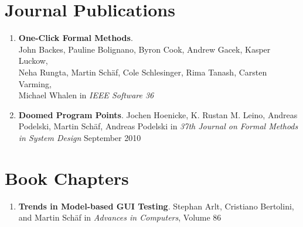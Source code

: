 \section{\sc Journal Publications}

\begin{enumerate} \setcounter{enumi}{\value{saveenum}}

\item \textbf{One-Click Formal Methods}.
\\ John Backes, Pauline Bolignano, Byron Cook, Andrew Gacek, Kasper Luckow, \\
Neha Rungta, Martin Sch\"af, Cole Schlesinger, Rima Tanash, Carsten Varming, \\
Michael Whalen in 
\emph{IEEE Software 36}

\item  \textbf{Doomed Program Points}. Jochen Hoenicke, K. Rustan M. Leino,
Andreas Podelski, Martin Sch\"af, Andreas Podelski in
\emph{37th Journal on Formal Methods in System Design}
September 2010

\setcounter{saveenum}{\value{enumi}}
\end{enumerate}


\section{\sc Book Chapters}

\begin{enumerate} \setcounter{enumi}{\value{saveenum}}

  \item \textbf{Trends in Model-based GUI Testing}. Stephan Arlt, Cristiano
  Bertolini, and Martin Sch\"af in \emph{Advances in Computers}, Volume 86
  
 \setcounter{saveenum}{\value{enumi}} 
\end{enumerate}

\iffalse
\section{\sc Drafts and Technical Reports}

\begin{enumerate}\setcounter{enumi}{\value{saveenum}}
 \item \textbf{Towards Bounded Infeasible Code Detection}. J�rgen Christ, Jochen
 Hoenicke, and Martin Sch\"af, arXiv:1205.6527, May 2012 
 
 \item \textbf{Grey-box GUI Testing: Efficient Generation of Event Sequences}.
 Stephan Arlt, Cristiano Bertolini, Ishan Banerjee, Atif Memon, and Martin
 Sch\"af,\\ arXiv:1205.4928, May 2012 
 
 \item \textbf{Slicing Abstraction using Path Formulas}. Evren Ermis, Jochen
 Hoenicke, Andreas Podelski, and Martin Sch{\"a}f. UNU Technical Report Nr.
 449, June 2011
  
 \setcounter{saveenum}{\value{enumi}} 
\end{enumerate}
\fi

